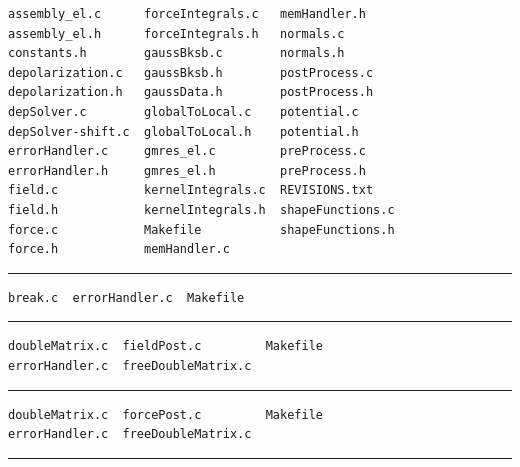 \documentclass[12pt]{report}
\begin{document}
\begin{verbatim}
assembly_el.c      forceIntegrals.c   memHandler.h
assembly_el.h      forceIntegrals.h   normals.c
constants.h        gaussBksb.c        normals.h
depolarization.c   gaussBksb.h        postProcess.c
depolarization.h   gaussData.h        postProcess.h
depSolver.c        globalToLocal.c    potential.c
depSolver-shift.c  globalToLocal.h    potential.h
errorHandler.c     gmres_el.c         preProcess.c
errorHandler.h     gmres_el.h         preProcess.h
field.c            kernelIntegrals.c  REVISIONS.txt
field.h            kernelIntegrals.h  shapeFunctions.c
force.c            Makefile           shapeFunctions.h
force.h            memHandler.c
\end{verbatim}
\hrule
\pagebreak


\begin{verbatim}
break.c  errorHandler.c  Makefile
\end{verbatim}
\hrule\vspace{1em}


\begin{verbatim}
doubleMatrix.c  fieldPost.c         Makefile
errorHandler.c  freeDoubleMatrix.c
\end{verbatim}
\hrule\vspace{1em}


\begin{verbatim}
doubleMatrix.c  forcePost.c         Makefile
errorHandler.c  freeDoubleMatrix.c
\end{verbatim}
\hrule\vspace{1em}

\end{document}
